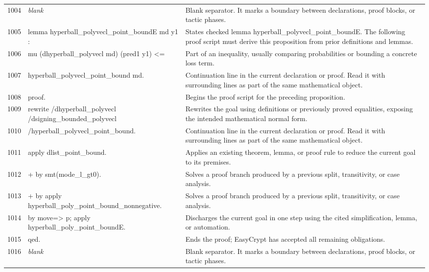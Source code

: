 \documentclass[10pt]{article}
\begin{document}
\begin{longtable}{r L{0.53\textwidth} L{0.37\textwidth}}
1004 & {\ttfamily\scriptsize \emph{blank}} & Blank separator.  It marks a boundary between declarations, proof blocks, or tactic phases. \\
1005 & {\ttfamily\scriptsize lemma hyperball\_polyvecl\_point\_boundE md y1 :} & States checked lemma hyperball\_polyvecl\_point\_boundE.  The following proof script must derive this proposition from prior definitions and lemmas. \\
1006 & {\ttfamily\scriptsize   mu (dhyperball\_polyvecl md) (pred1 y1) <=} & Part of an inequality, usually comparing probabilities or bounding a concrete loss term. \\
1007 & {\ttfamily\scriptsize   hyperball\_polyvecl\_point\_bound md.} & Continuation line in the current declaration or proof.  Read it with surrounding lines as part of the same mathematical object. \\
1008 & {\ttfamily\scriptsize proof.} & Begins the proof script for the preceding proposition. \\
1009 & {\ttfamily\scriptsize rewrite /dhyperball\_polyvecl /dsigning\_bounded\_polyvecl} & Rewrites the goal using definitions or previously proved equalities, exposing the intended mathematical normal form. \\
1010 & {\ttfamily\scriptsize         /hyperball\_polyvecl\_point\_bound.} & Continuation line in the current declaration or proof.  Read it with surrounding lines as part of the same mathematical object. \\
1011 & {\ttfamily\scriptsize apply dlist\_point\_bound.} & Applies an existing theorem, lemma, or proof rule to reduce the current goal to its premises. \\
1012 & {\ttfamily\scriptsize + by smt(mode\_l\_gt0).} & Solves a proof branch produced by a previous split, transitivity, or case analysis. \\
1013 & {\ttfamily\scriptsize + by apply hyperball\_poly\_point\_bound\_nonnegative.} & Solves a proof branch produced by a previous split, transitivity, or case analysis. \\
1014 & {\ttfamily\scriptsize by move=> p; apply hyperball\_poly\_point\_boundE.} & Discharges the current goal in one step using the cited simplification, lemma, or automation. \\
1015 & {\ttfamily\scriptsize qed.} & Ends the proof; EasyCrypt has accepted all remaining obligations. \\
1016 & {\ttfamily\scriptsize \emph{blank}} & Blank separator.  It marks a boundary between declarations, proof blocks, or tactic phases. \\

\end{longtable}
\end{document}
